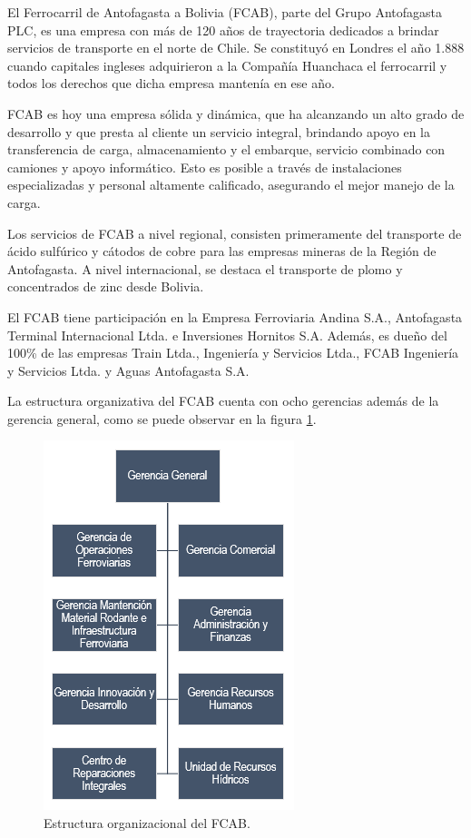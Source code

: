 \documentclass[oneside,12pt, letterpaper, titlepage]{book}
\begin{document}
El Ferrocarril de Antofagasta a Bolivia (FCAB), parte del Grupo Antofagasta PLC, es una empresa con más de 120 años de trayectoria dedicados a brindar servicios de transporte en el norte de Chile. Se constituyó en Londres el año 1.888 cuando capitales ingleses adquirieron a la Compañía Huanchaca el ferrocarril y todos los derechos que dicha empresa mantenía en ese año. 

FCAB es hoy una empresa sólida y dinámica, que ha alcanzando un alto grado de desarrollo y que presta al cliente un servicio integral, brindando apoyo en la transferencia de carga, almacenamiento y el embarque, servicio combinado con camiones y apoyo informático. Esto es posible a través de instalaciones especializadas y personal altamente calificado, asegurando el mejor manejo de la carga.

Los servicios de FCAB a nivel regional, consisten primeramente del transporte de ácido sulfúrico y cátodos de cobre para las empresas mineras de la Región de Antofagasta. A nivel internacional, se destaca el transporte de plomo y concentrados de zinc desde Bolivia.

El FCAB tiene participación en la Empresa Ferroviaria Andina S.A., Antofagasta Terminal Internacional Ltda. e Inversiones Hornitos S.A. Además, es dueño del 100\% de las empresas Train Ltda., Ingeniería y Servicios Ltda., FCAB Ingeniería y Servicios Ltda. y  Aguas Antofagasta S.A.

La estructura organizativa del FCAB cuenta con ocho gerencias además de la gerencia general, como se puede observar en la figura \ref{fig:orgFCAB}.

\begin{figure}[H]
    \centering
    \includegraphics[scale=0.8]{./images/OrganigramaFCAB}
    \caption{Estructura organizacional del FCAB.}
    \label{fig:orgFCAB}
\end{figure}
\end{document}
